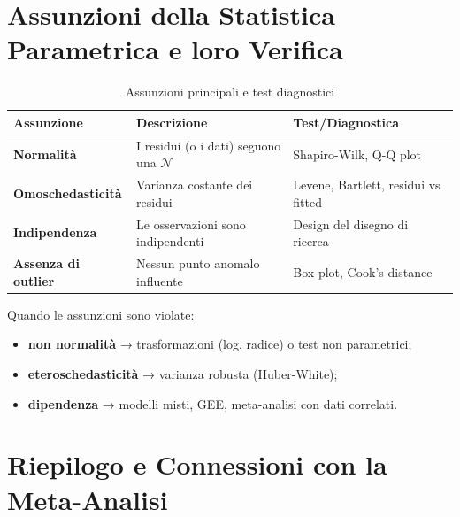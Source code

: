 \documentclass[12pt, a4paper]{article}
\newcommand{\N}{\mathcal{N}}
\begin{document}
\section{Assunzioni della Statistica Parametrica e loro Verifica}

\begin{table}[h!]
  \centering
  \caption{Assunzioni principali e test diagnostici}
  \begin{tabular}{>{\bfseries}p{3.5cm} p{5cm} p{4cm}}
    \toprule
    Assunzione & Descrizione & Test/Diagnostica \\
    \midrule
    Normalità &
      I residui (o i dati) seguono una $\N$ &
      Shapiro-Wilk, Q-Q plot \\[6pt]
    Omoschedasticità &
      Varianza costante dei residui &
      Levene, Bartlett, residui vs fitted \\[6pt]
    Indipendenza &
      Le osservazioni sono indipendenti &
      Design del disegno di ricerca \\[6pt]
    Assenza di outlier &
      Nessun punto anomalo influente &
      Box-plot, Cook's distance \\
    \bottomrule
  \end{tabular}
\end{table}

\begin{chiave}
  Quando le assunzioni sono violate:
  \begin{itemize}
    \item \textbf{non normalità} → trasformazioni (log, radice) o test non parametrici;
    \item \textbf{eteroschedasticità} → varianza robusta (Huber-White);
    \item \textbf{dipendenza} → modelli misti, GEE, meta-analisi con dati correlati.
  \end{itemize}
\end{chiave}

\section{Riepilogo e Connessioni con la Meta-Analisi}
\end{document}
